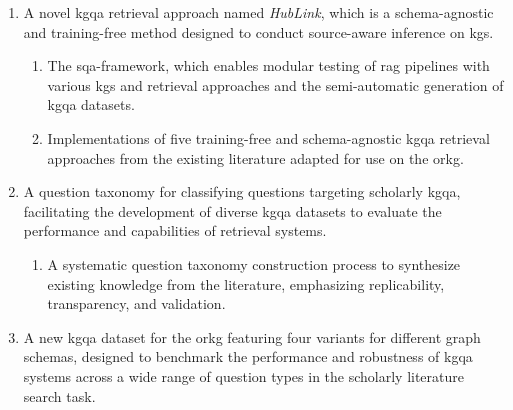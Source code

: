 \begin{enumerate}[label=\textbf{C\arabic*}, leftmargin=2.5em]
    \item \label{enum:c1} A novel \gls{kgqa} retrieval approach named \emph{HubLink}, which is a schema-agnostic and training-free method designed to conduct source-aware inference on \glspl{kg}.
    \begin{enumerate}[label=\textbf{C1.\arabic*}]
        \item \label{enum:c1.1} The \gls{sqa}-framework, which enables modular testing of \gls{rag} pipelines with various \glspl{kg} and retrieval approaches and the semi-automatic generation of \gls{kgqa} datasets.
        \item \label{enum:c1.2} Implementations of five training-free and schema-agnostic \gls{kgqa} retrieval approaches from the existing literature adapted for use on the \gls{orkg}.
    \end{enumerate}
    \item \label{enum:c2} A question taxonomy for classifying questions targeting scholarly \gls{kgqa}, facilitating the development of diverse \gls{kgqa} datasets to evaluate the performance and capabilities of retrieval systems.
    \begin{enumerate}[label=\textbf{C2.\arabic*}]
        \item \label{enum:c2.2} A systematic question taxonomy construction process to synthesize existing knowledge from the literature, emphasizing replicability, transparency, and validation.
    \end{enumerate}
    \item \label{enum:c3} A new \gls{kgqa} dataset for the \gls{orkg} featuring four variants for different graph schemas, designed to benchmark the performance and robustness of \gls{kgqa} systems across a wide range of question types in the scholarly literature search task.
\end{enumerate}

